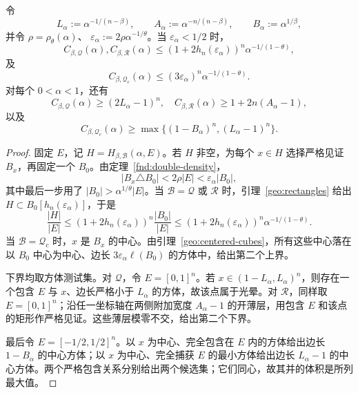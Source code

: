 \begin{theorem}[三类基的显式端点界]
\label{geo:explicit-bounds}
令
\[
 L_\alpha:=\alpha^{-1/(n-\beta)},\qquad
 A_\alpha:=\alpha^{-n/(n-\beta)},\qquad
 B_\alpha:=\alpha^{1/\beta},
\]
并令 $\rho=\rho_\theta(\alpha)$、
$\varepsilon_\alpha:=2\rho\alpha^{-1/\theta}$。当
$\varepsilon_\alpha<1/2$ 时，
\begin{equation}
 C_{\beta,\mathcal Q}(\alpha),C_{\beta,\mathcal R}(\alpha)
 \leq (1+2h_n(\varepsilon_\alpha))^n
 \alpha^{-1/(1-\theta)},
 \label{geo:noncentered-upper}
\end{equation}
及
\begin{equation}
 C_{\beta,\mathcal Q_c}(\alpha)
 \leq(3\varepsilon_\alpha)^n\alpha^{-1/(1-\theta)}.
 \label{geo:centered-upper}
\end{equation}
对每个 $0<\alpha<1$，还有
\[
 C_{\beta,\mathcal Q}(\alpha)\geq(2L_\alpha-1)^n,
 \quad C_{\beta,\mathcal R}(\alpha)\geq1+2n(A_\alpha-1),
\]
以及
\[
 C_{\beta,\mathcal Q_c}(\alpha)
 \geq\max\{(1-B_\alpha)^n,(L_\alpha-1)^n\}.
\]
\end{theorem}

\begin{proof}
固定 $E$，记 $H=H_{\beta,\mathcal B}(\alpha,E)$。若 $H$ 非空，为每个 $x\in H$ 选择严格见证 $B_x$，再固定一个 $B_0$。由定理~\ref{fnd:double-density}，
\[
 |B_x\triangle B_0|<2\rho|E|
 <\varepsilon_\alpha|B_0|,
\]
其中最后一步用了 $|B_0|>\alpha^{1/\theta}|E|$。当
$\mathcal B=\mathcal Q$ 或 $\mathcal R$ 时，引理~\ref{geo:rectangles} 给出
$H\subset B_0[h_n(\varepsilon_\alpha)]$，于是
\[
 \frac{|H|}{|E|}
 \leq(1+2h_n(\varepsilon_\alpha))^n\frac{|B_0|}{|E|}
 \leq(1+2h_n(\varepsilon_\alpha))^n\alpha^{-1/(1-\theta)}.
\]
当 $\mathcal B=\mathcal Q_c$ 时，$x$ 是 $B_x$ 的中心。由引理~\ref{geo:centered-cubes}，所有这些中心落在以 $B_0$ 中心为中心、边长 $3\varepsilon_\alpha\ell(B_0)$ 的方体中，给出第二个上界。

下界均取方体测试集。对 $\mathcal Q$，令 $E=[0,1]^n$。若 $x\in(1-L_\alpha,L_\alpha)^n$，则存在一个包含 $E$ 与 $x$、边长严格小于 $L_\alpha$ 的方体，故该点属于光晕。对 $\mathcal R$，同样取 $E=[0,1]^n$；沿任一坐标轴在两侧附加宽度 $A_\alpha-1$ 的开薄层，用包含 $E$ 和该点的矩形作严格见证。这些薄层模零不交，给出第二个下界。

最后令 $E=[-1/2,1/2]^n$。以 $x$ 为中心、完全包含在 $E$ 内的方体给出边长 $1-B_\alpha$ 的中心方体；以 $x$ 为中心、完全捕获 $E$ 的最小方体给出边长 $L_\alpha-1$ 的中心方体。两个严格包含关系分别给出两个候选集；它们同心，故其并的体积是所列最大值。
\end{proof}

